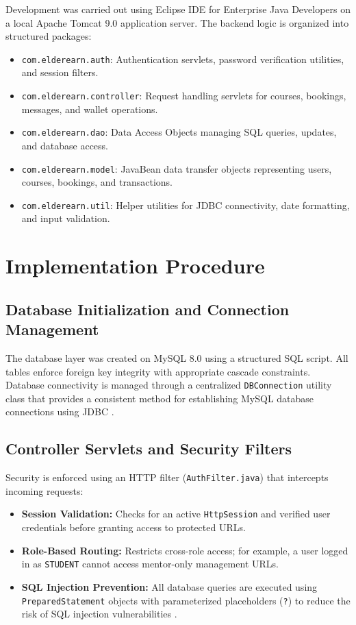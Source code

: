 \documentclass[12pt,a4paper]{report}
\begin{document}
Development was carried out using Eclipse IDE for Enterprise Java Developers on a local Apache Tomcat 9.0 application server. The backend logic is organized into structured packages:
\begin{itemize}[leftmargin=1.5em, itemsep=2pt]
  \item \texttt{com.elderearn.auth}: Authentication servlets, password verification utilities, and session filters.
  \item \texttt{com.elderearn.controller}: Request handling servlets for courses, bookings, messages, and wallet operations.
  \item \texttt{com.elderearn.dao}: Data Access Objects managing SQL queries, updates, and database access.
  \item \texttt{com.elderearn.model}: JavaBean data transfer objects representing users, courses, bookings, and transactions.
  \item \texttt{com.elderearn.util}: Helper utilities for JDBC connectivity, date formatting, and input validation.
\end{itemize}

\section{Implementation Procedure}

\subsection{Database Initialization and Connection Management}
The database layer was created on MySQL 8.0 using a structured SQL script. All tables enforce foreign key integrity with appropriate cascade constraints. Database connectivity is managed through a centralized \texttt{DBConnection} utility class that provides a consistent method for establishing MySQL database connections using JDBC \cite{mysqlref}.

\subsection{Controller Servlets and Security Filters}
Security is enforced using an HTTP filter (\texttt{AuthFilter.java}) that intercepts incoming requests:
\begin{itemize}[leftmargin=1.5em, itemsep=2pt]
  \item \textbf{Session Validation:} Checks for an active \texttt{HttpSession} and verified user credentials before granting access to protected URLs.
  \item \textbf{Role-Based Routing:} Restricts cross-role access; for example, a user logged in as \texttt{STUDENT} cannot access mentor-only management URLs.
  \item \textbf{SQL Injection Prevention:} All database queries are executed using \texttt{PreparedStatement} objects with parameterized placeholders (\texttt{?}) to reduce the risk of SQL injection vulnerabilities \cite{silberschatz}.
\end{itemize}
\end{document}

